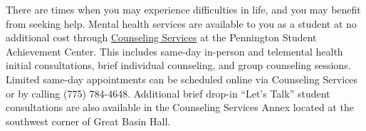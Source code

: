 There are times when you may experience difficulties in life, and you may benefit
from seeking help. Mental health services are available to you as a student at no
additional cost through \href{https://www.unr.edu/counseling}{Counseling Services}
at the Pennington Student Achievement Center. This includes same-day in-person and
telemental health initial consultations, brief individual counseling, and group
counseling sessions. Limited same-day appointments can be scheduled online via
Counseling Services or by calling (775) 784-4648. Additional brief drop-in
``Let's Talk'' student consultations are also available in the Counseling Services
Annex located at the southwest corner of Great Basin Hall.
